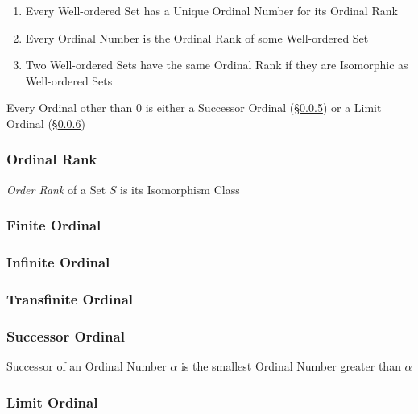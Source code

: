 \begin{enumerate}
  \item Every Well-ordered Set has a Unique Ordinal Number for its
    Ordinal Rank
  \item Every Ordinal Number is the Ordinal Rank of some Well-ordered
    Set
  \item Two Well-ordered Sets have the same Ordinal Rank if they are
    Isomorphic as Well-ordered Sets
\end{enumerate}

Every Ordinal other than $0$ is either a Successor Ordinal
(\S\ref{sec:successor_ordinal}) or a Limit Ordinal
(\S\ref{sec:limit_ordinal})



\subsubsection{Ordinal Rank}\label{sec:ordinal_rank}

\emph{Order Rank} of a Set $S$ is its Isomorphism Class



\subsubsection{Finite Ordinal}\label{sec:finite_ordinal}

\subsubsection{Infinite Ordinal}\label{sec:infinite_ordinal}

\subsubsection{Transfinite Ordinal}\label{sec:transfinite_ordinal}

\subsubsection{Successor Ordinal}\label{sec:successor_ordinal}

Successor of an Ordinal Number $\alpha$ is the smallest Ordinal Number
greater than $\alpha$



\subsubsection{Limit Ordinal}\label{sec:limit_ordinal}

